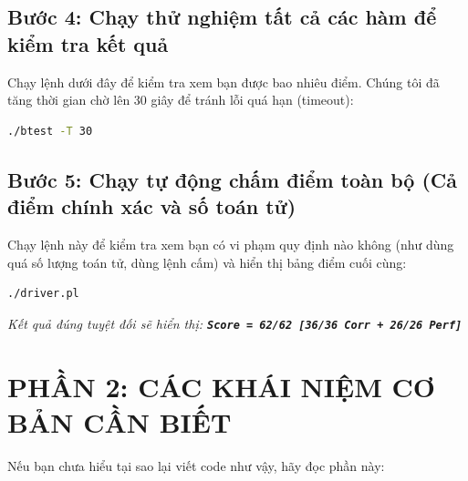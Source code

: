 \documentclass[12pt, a4paper]{article}
\begin{document}
\subsection{Bước 4: Chạy thử nghiệm tất cả các hàm để kiểm tra kết quả}
Chạy lệnh dưới đây để kiểm tra xem bạn được bao nhiêu điểm. Chúng tôi đã tăng thời gian chờ lên 30 giây để tránh lỗi quá hạn (timeout):
\begin{lstlisting}[language=bash]
./btest -T 30
\end{lstlisting}

\subsection{Bước 5: Chạy tự động chấm điểm toàn bộ (Cả điểm chính xác và số toán tử)}
Chạy lệnh này để kiểm tra xem bạn có vi phạm quy định nào không (như dùng quá số lượng toán tử, dùng lệnh cấm) và hiển thị bảng điểm cuối cùng:
\begin{lstlisting}[language=bash]
./driver.pl
\end{lstlisting}
\textit{Kết quả đúng tuyệt đối sẽ hiển thị: \textbf{\texttt{Score = 62/62 [36/36 Corr + 26/26 Perf]}}}



\section{PHẦN 2: CÁC KHÁI NIỆM CƠ BẢN CẦN BIẾT}
Nếu bạn chưa hiểu tại sao lại viết code như vậy, hãy đọc phần này:
\end{document}
